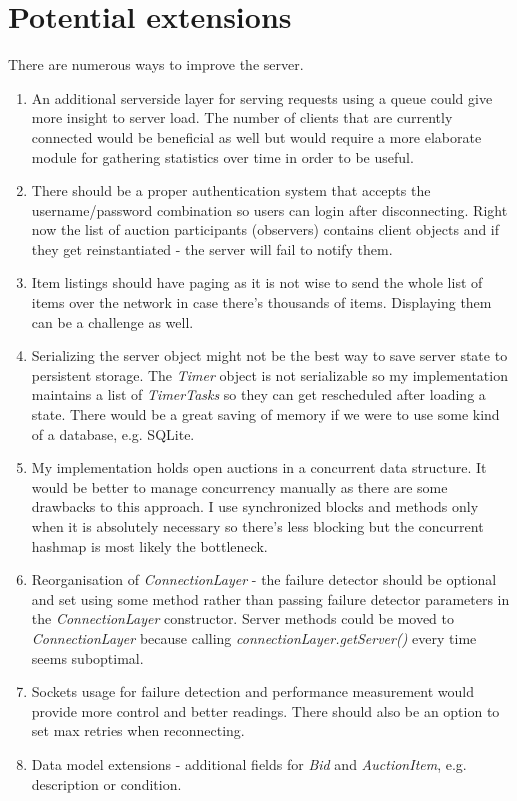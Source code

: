 \documentclass[10pt]{article}
\begin{document}
\section{Potential extensions}
There are numerous ways to improve the server.
\begin{enumerate}
\item An additional serverside layer for serving requests using a queue could give more insight to server load. The number of clients that are currently connected would be beneficial as well but would require a more elaborate module for gathering statistics over time in order to be useful.
\item There should be a proper authentication system that accepts the username/password combination so users can login after disconnecting. Right now the list of auction participants (observers) contains client objects and if they get reinstantiated - the server will fail to notify them.
\item Item listings should have paging as it is not wise to send the whole list of items over the network in case there's thousands of items. Displaying them can be a challenge as well.
\item Serializing the server object might not be the best way to save server state to persistent storage. The \textit{Timer} object is not serializable so my implementation maintains a list of \textit{TimerTasks} so they can get rescheduled after loading a state. There would be a great saving of memory if we were to use some kind of a database, e.g. SQLite.
\item My implementation holds open auctions in a concurrent data structure. It would be better to manage concurrency manually as there are some drawbacks to this approach. I use synchronized blocks and methods only when it is absolutely necessary so there's less blocking but the concurrent hashmap is most likely the bottleneck.
\item Reorganisation of \textit{ConnectionLayer} - the failure detector should be optional and set using some method rather than passing failure detector parameters in the \textit{ConnectionLayer} constructor. Server methods could be moved to \textit{ConnectionLayer} because calling \textit{connectionLayer.getServer()} every time seems suboptimal.
\item Sockets usage for failure detection and performance measurement would provide more control and better readings. There should also be an option to set max retries when reconnecting.
\item Data model extensions - additional fields for \textit{Bid} and \textit{AuctionItem}, e.g. description or condition.
\end{enumerate}
\pagebreak
\end{document}
